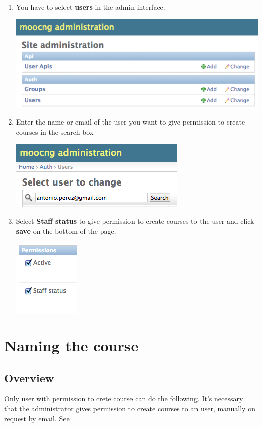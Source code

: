\documentclass[letterpaper,10pt,english]{sphinxmanual}
\begin{document}
\begin{enumerate}
\item {} 
You have to select \textbf{users} in the admin interface.

\includegraphics{0_permission_to_create_a_course-4.png}

\item {} 
Enter the name or email of the user you want to give permission to create courses in the search box

\includegraphics{0_permission_to_create_a_course-5.png}

\item {} 
Select \textbf{Staff status} to give permission to create courses to the user and click \textbf{save} on the bottom of the page.

\includegraphics{0_permission_to_create_a_course-6.png}

\end{enumerate}


\chapter{Naming the course}
\label{naming_the_course::doc}\label{naming_the_course:naming-the-course}\label{naming_the_course:id1}

\section{Overview}
\label{naming_the_course:overview}
Only user with permission to crete course can do the following. It's necessary that the administrator
gives permission to create courses to an user, manually on request by email. See
\end{document}
